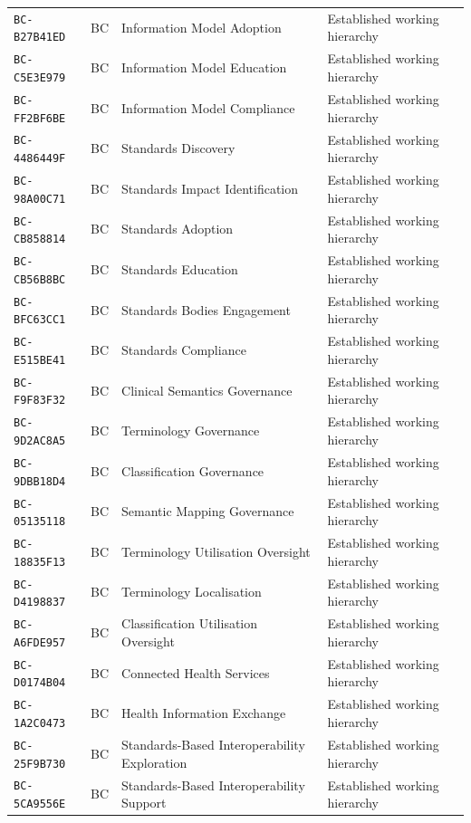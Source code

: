\documentclass[11pt,a4paper,openany]{book}
\begin{document}
\begin{longtable}{@{}p{.19\linewidth}p{.12\linewidth}p{.39\linewidth}p{.24\linewidth}@{}}
\texttt{BC-B27B41ED} & BC & Information Model Adoption & Established working hierarchy \\
\texttt{BC-C5E3E979} & BC & Information Model Education & Established working hierarchy \\
\texttt{BC-FF2BF6BE} & BC & Information Model Compliance & Established working hierarchy \\
\texttt{BC-4486449F} & BC & Standards Discovery & Established working hierarchy \\
\texttt{BC-98A00C71} & BC & Standards Impact Identification & Established working hierarchy \\
\texttt{BC-CB858814} & BC & Standards Adoption & Established working hierarchy \\
\texttt{BC-CB56B8BC} & BC & Standards Education & Established working hierarchy \\
\texttt{BC-BFC63CC1} & BC & Standards Bodies Engagement & Established working hierarchy \\
\texttt{BC-E515BE41} & BC & Standards Compliance & Established working hierarchy \\
\texttt{BC-F9F83F32} & BC & Clinical Semantics Governance & Established working hierarchy \\
\texttt{BC-9D2AC8A5} & BC & Terminology Governance & Established working hierarchy \\
\texttt{BC-9DBB18D4} & BC & Classification Governance & Established working hierarchy \\
\texttt{BC-05135118} & BC & Semantic Mapping Governance & Established working hierarchy \\
\texttt{BC-18835F13} & BC & Terminology Utilisation Oversight & Established working hierarchy \\
\texttt{BC-D4198837} & BC & Terminology Localisation & Established working hierarchy \\
\texttt{BC-A6FDE957} & BC & Classification Utilisation Oversight & Established working hierarchy \\
\texttt{BC-D0174B04} & BC & Connected Health Services & Established working hierarchy \\
\texttt{BC-1A2C0473} & BC & Health Information Exchange & Established working hierarchy \\
\texttt{BC-25F9B730} & BC & Standards-Based Interoperability Exploration & Established working hierarchy \\
\texttt{BC-5CA9556E} & BC & Standards-Based Interoperability Support & Established working hierarchy \\

\end{longtable}
\end{document}
